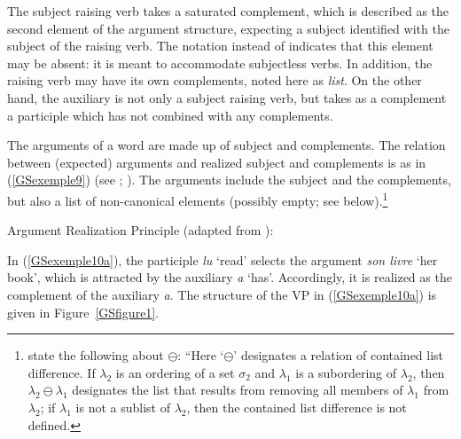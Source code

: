\noindent
The subject raising verb takes a saturated complement, which is described as the second
element of the argument structure, expecting a subject  identified with the subject of the
raising verb. The notation  instead of  indicates that this element may be
absent: it is meant to accommodate subjectless verbs. In addition, the raising verb may have its own
complements, noted here as \emph{list}. On the other hand, the auxiliary is not only a subject raising
verb, but takes as a complement a participle which has not combined with any complements.

The arguments of a word are made up of subject and complements. The relation between (expected)
arguments and realized subject and complements is as in (\ref{GSexemple9}) (see
\citealt[171]{GSag2000a-u}; \citealt[]{BMS2001a}). The arguments include the subject
and  the complements, but also a list of non-canonical elements (possibly empty; see below).\footnote{\citet[]{GSag2000a-u} state the
  following about $\ominus$\is{$\ominus$}: ``Here `$\ominus$' designates a relation of contained list difference. If
$\lambda_2$ is an ordering of a set $\sigma_2$ and $\lambda_1$ is a subordering of $\lambda_2$, then
$\lambda_2 \ominus \lambda_1$ designates the list that results from removing all members of
$\lambda_1$ from $\lambda_2$; if $\lambda_1$ is not a sublist of $\lambda_2$, then the contained
list difference is not defined.}

\largerpage%
\ea
Argument Realization Principle (adapted from \citealt[171]{GSag2000a-u}):\\
 \impl
{}
\label{GSexemple9}
\z

\noindent
In (\ref{GSexemple10a}), the participle \emph{lu} `read' selects the argument \emph{son livre} `her book', which is attracted by the auxiliary \emph{a} `has'. Accordingly, it is realized as the complement of the auxiliary \emph{a}. The structure of the VP in (\ref{GSexemple10a}) is given in Figure~\ref{GSfigure1}.

\eal
	\label{GSexemple10}
	\label{GSexemple10a}
		
